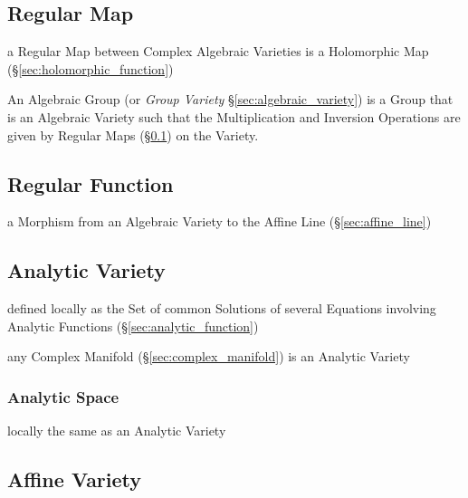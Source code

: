 \subsection{Regular Map}\label{sec:regular_map}

a Regular Map between Complex Algebraic Varieties is a Holomorphic Map
(\S\ref{sec:holomorphic_function})

An Algebraic Group (or \emph{Group Variety} \S\ref{sec:algebraic_variety}) is a
Group that is an Algebraic Variety such that the Multiplication and Inversion
Operations are given by Regular Maps (\S\ref{sec:regular_map}) on the Variety.



\subsection{Regular Function}\label{sec:regular_function}

a Morphism from an Algebraic Variety to the Affine Line
(\S\ref{sec:affine_line})



\subsection{Analytic Variety}\label{sec:analytic_variety}

defined locally as the Set of common Solutions of several Equations involving
Analytic Functions (\S\ref{sec:analytic_function})

any Complex Manifold (\S\ref{sec:complex_manifold}) is an Analytic Variety



\subsubsection{Analytic Space}\label{sec:analytic_space}

locally the same as an Analytic Variety




\subsection{Affine Variety}\label{sec:affine_variety}

